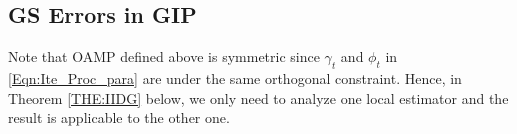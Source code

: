 \documentclass[journal]{IEEEtran}
\newcommand{\mr}{\mathrm}
\renewcommand{\bf}{\bm}
\begin{document}
 




\subsection{GS Errors in GIP}\label{Sec:GSE}

Note that OAMP defined above is symmetric since $\gamma_t$ and $\phi_t$ in \eqref{Eqn:Ite_Proc_para} are under the same orthogonal constraint. Hence, in Theorem \ref{THE:IIDG} below, we only need to analyze one local estimator and the result is applicable to the other one.   
\end{document}

